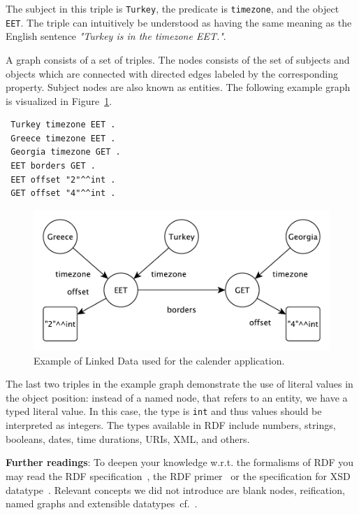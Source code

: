 The subject in this triple is \texttt{Turkey}, the predicate is \texttt{timezone}, and the object \texttt{EET}.
The triple can intuitively be understood as having the same meaning as the English sentence \textit{"Turkey is in the timezone EET."}.

A graph consists of a set of triples.
The nodes consists of the set of subjects and objects which are connected with directed edges labeled by the corresponding property.
Subject nodes are also known as entities.
The following example graph is visualized in Figure~\ref{fig:graph}.
\begin{verbatim}
 Turkey timezone EET .
 Greece timezone EET .
 Georgia timezone GET .
 EET borders GET .
 EET offset "2"^^int .
 GET offset "4"^^int . 
\end{verbatim}

\begin{figure}
\includegraphics[width=\linewidth]{part_01/fig_graph.pdf}
\caption{Example of Linked Data used for the calender application.}
\label{fig:graph}
\end{figure}

The last two triples in the example graph demonstrate the use of literal values in the object position: instead of a named node, that refers to an entity, we have a typed literal value.
In this case, the type is \texttt{int} and thus values should be interpreted as integers.
The types available in \ac{RDF} include numbers, strings, booleans, dates, time durations, URIs, XML, and others.

\medskip

\textbf{Further readings}:
To deepen your knowledge w.r.t. the formalisms of \ac{RDF} you may read the \ac{RDF} specification~\cite{rdf-spec}, 
the \ac{RDF} primer~\cite{rdfprimer} or 
the specification for XSD datatype~\cite{xsd-part2}.
Relevant concepts we did not introduce are blank nodes, reification, named graphs and extensible datatypes~cf.~\cite{namedgraphs,rdfprimer}.


